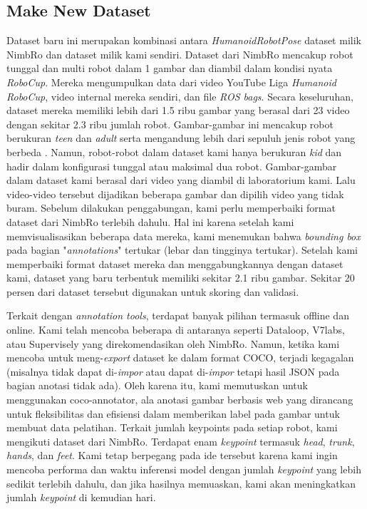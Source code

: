 \subsection{Make New Dataset}
\label{subsec:make-new-dataset}

Dataset baru ini merupakan kombinasi antara \textit{HumanoidRobotPose} dataset milik NimbRo dan dataset milik kami sendiri. 
Dataset dari NimbRo mencakup robot tunggal dan multi robot dalam 1 gambar dan diambil dalam kondisi nyata \textit{RoboCup}. 
Mereka mengumpulkan data dari video YouTube Liga \textit{Humanoid RoboCup}, video internal mereka sendiri, dan file \textit{ROS bags}. 
Secara keseluruhan, dataset mereka memiliki lebih dari 1.5 ribu gambar yang berasal dari 23 video dengan sekitar 2.3 ribu jumlah robot. 
Gambar-gambar ini mencakup robot berukuran \textit{teen} dan \textit{adult} serta mengandung lebih dari sepuluh jenis robot yang berbeda \parencite{amini2021}.
Namun, robot-robot dalam dataset kami hanya berukuran \textit{kid} dan hadir dalam konfigurasi tunggal atau maksimal dua robot. Gambar-gambar dalam dataset kami berasal dari video yang diambil di laboratorium kami. Lalu video-video tersebut dijadikan beberapa gambar dan dipilih video yang tidak buram.
Sebelum dilakukan penggabungan, kami perlu memperbaiki format dataset dari NimbRo terlebih dahulu. Hal ini karena setelah kami memvisualisasikan beberapa data mereka, kami menemukan bahwa \textit{bounding box} pada bagian "\textit{annotations}" tertukar (lebar dan tingginya tertukar).
Setelah kami memperbaiki format dataset mereka dan menggabungkannya dengan dataset kami, dataset yang baru terbentuk memiliki sekitar 2.1 ribu gambar.
Sekitar 20 persen dari dataset tersebut digunakan untuk skoring dan validasi.

Terkait dengan \textit{annotation tools}, terdapat banyak pilihan termasuk offline dan online. Kami telah mencoba beberapa di antaranya seperti Dataloop, V7labs, atau Supervisely yang direkomendasikan oleh NimbRo. Namun, ketika kami mencoba untuk meng-\textit{export} dataset ke dalam format COCO,
terjadi kegagalan (misalnya tidak dapat di-\textit{impor} atau dapat di-\textit{impor} tetapi hasil JSON pada bagian anotasi tidak ada). Oleh karena itu, kami memutuskan untuk menggunakan coco-annotator, ala anotasi gambar berbasis web yang dirancang untuk fleksibilitas dan efisiensi dalam memberikan label pada gambar untuk membuat data pelatihan.
Terkait jumlah keypoints pada setiap robot, kami mengikuti dataset dari NimbRo. Terdapat enam \textit{keypoint} termasuk \textit{head}, \textit{trunk}, \textit{hands}, dan \textit{feet}. Kami tetap berpegang pada ide tersebut karena kami ingin mencoba performa dan waktu inferensi model dengan jumlah \textit{keypoint} yang lebih sedikit terlebih dahulu, dan jika hasilnya memuaskan, kami akan meningkatkan jumlah \textit{keypoint} di kemudian hari.

